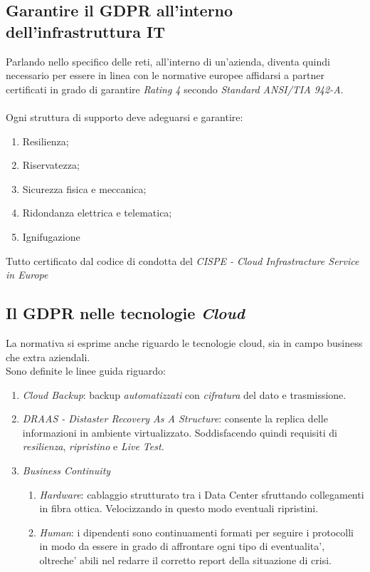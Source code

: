 \documentclass[a4paper,12pt]{article}
\begin{document}
\subsection{Garantire il GDPR all'interno dell'infrastruttura IT}
Parlando nello specifico delle reti, all'interno di un'azienda, diventa quindi necessario per essere in linea con le normative europee affidarsi a partner certificati 
in grado di garantire \textit{Rating 4} secondo \textit{Standard ANSI/TIA 942-A}. \\ \\ 
Ogni struttura di supporto deve adeguarsi e garantire:
\begin{enumerate}
    \item Resilienza;
    \item Riservatezza;
    \item Sicurezza fisica e meccanica;
    \item Ridondanza elettrica e telematica;
    \item Ignifugazione
\end{enumerate}

Tutto certificato dal codice di condotta del \textit{CISPE - Cloud Infrastracture Service in Europe}

\subsection{Il GDPR nelle tecnologie \textit{Cloud}}
La normativa si esprime anche riguardo le tecnologie cloud, sia in campo business che extra aziendali. \\
Sono definite le linee guida riguardo:
\begin{enumerate}
    \item \textit{Cloud Backup}: backup \textit{automatizzati} con \textit{cifratura} del dato e trasmissione.
    \item \textit{DRAAS - Distaster Recovery As A Structure}: consente la replica delle informazioni in ambiente
    virtualizzato. Soddisfacendo quindi requisiti di \textit{resilienza}, \textit{ripristino} e \textit{Live Test}.
    \item \textit{Business Continuity}
    \begin{enumerate}
        \item \textit{Hardware}: cablaggio strutturato tra i Data Center sfruttando collegamenti in fibra ottica. Velocizzando
        in questo modo eventuali ripristini.
        \item \textit{Human}: i dipendenti sono continuamenti formati per seguire i protocolli in modo da essere in grado di affrontare
        ogni tipo di eventualita', oltreche' abili nel redarre il corretto report della situazione di crisi.
    \end{enumerate}
\end{enumerate}
\end{document}
